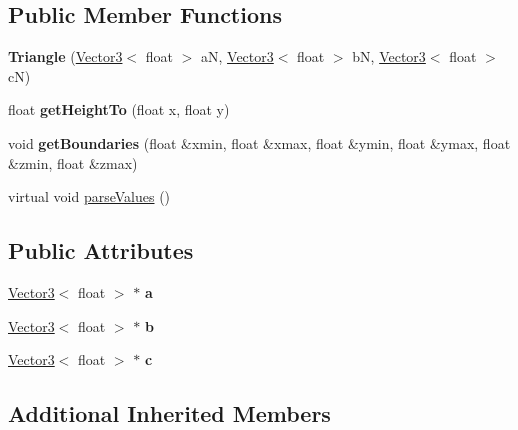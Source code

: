 \subsection*{Public Member Functions}
\begin{DoxyCompactItemize}
\item 
\mbox{\label{classTriangle_afe6d79db021d85e6c800bc257132a9cb}} 
{\bfseries Triangle} (\hyperlink{classVector3}{Vector3}$<$ float $>$ aN, \hyperlink{classVector3}{Vector3}$<$ float $>$ bN, \hyperlink{classVector3}{Vector3}$<$ float $>$ cN)
\item 
\mbox{\label{classTriangle_a6d1204422918a61ef68fbf93cdb7fd31}} 
float {\bfseries get\+Height\+To} (float x, float y)
\item 
\mbox{\label{classTriangle_aaa409363ad45dbdd0348330224e971fd}} 
void {\bfseries get\+Boundaries} (float \&xmin, float \&xmax, float \&ymin, float \&ymax, float \&zmin, float \&zmax)
\item 
virtual void \hyperlink{classTriangle_a3b08ac99b202202bf7dbf2504da91ba1}{parse\+Values} ()
\end{DoxyCompactItemize}
\subsection*{Public Attributes}
\begin{DoxyCompactItemize}
\item 
\mbox{\label{classTriangle_af7e91a067d28a51126e5263a5473971c}} 
\hyperlink{classVector3}{Vector3}$<$ float $>$ $\ast$ {\bfseries a}
\item 
\mbox{\label{classTriangle_a2bd3d9b2b01c58e95009dbbffedd2ac3}} 
\hyperlink{classVector3}{Vector3}$<$ float $>$ $\ast$ {\bfseries b}
\item 
\mbox{\label{classTriangle_a9a9b205e19002c2142e706595913d1f5}} 
\hyperlink{classVector3}{Vector3}$<$ float $>$ $\ast$ {\bfseries c}
\end{DoxyCompactItemize}
\subsection*{Additional Inherited Members}


